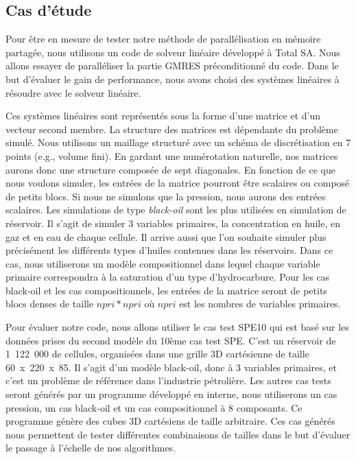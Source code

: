\subsection{Cas d'étude}
Pour être en mesure de tester notre méthode de parallélisation en mémoire partagée, nous utilisons un code de solveur linéaire développé à Total SA.
%
Nous allons essayer de paralléliser la partie GMRES préconditionné du code.
%
Dans le but d'évaluer le gain de performance, nous avons choisi des systèmes linéaires à résoudre avec le solveur linéaire.


Ces systèmes linéaires sont représentés sous la forme d'une matrice et d'un vecteur second membre.
%
La structure des matrices est dépendante du problème simulé.
%
Nous utilisons un maillage structuré avec un schéma de discrétisation en 7 points (e.g., volume fini).
%
En gardant une numérotation naturelle, nos matrices aurons donc une structure composée de sept diagonales.
%
En fonction de ce que nous voulons simuler, les entrées de la matrice pourront être scalaires ou composé de petits blocs.
%
Si nous ne simulons que la pression, nous aurons des entrées scalaires.
%
Les simulations de type {\em black-oil} sont les plus utilisées en simulation de réservoir.
%
Il s'agit de simuler 3 variables primaires, la concentration en huile, en gaz et en eau de chaque cellule.
%
Il arrive aussi que l'on souhaite simuler plus précisément les différents types d'huiles contenues dans les réservoirs.
%
Dans ce cas, nous utiliserons un modèle compositionnel dans lequel chaque variable primaire correspondra à la saturation d'un type d'hydrocarbure.
%
Pour les cas black-oil et les cas compositionnels, les entrées de la matrice seront de petits blocs denses de taille $npri*npri$ où $npri$ est les nombres de variables primaires.

Pour évaluer notre code, nous allons utiliser le cas test SPE10 qui est basé sur les données prises du second modèle du 10ème cas test SPE\cite{SPE10}.
%
C'est un réservoir de 1~122~000 de cellules, organisées dans une grille 3D cartésienne de taille 60~x~220~x~85.
%
Il s'agit d'un modèle black-oil, donc à 3 variables primaires, et c'est un problème de référence dans l'industrie pétrolière.
%
Les autres cas tests seront générés par un programme développé en interne, nous utiliserons un cas pression, un cas black-oil et un cas compositionnel à 8 composants.
%
Ce programme génère des cubes 3D cartésiens de taille arbitraire.
%
Ces cas générés nous permettent de tester différentes combinaisons de tailles dans le but d'évaluer le passage à l'échelle de nos algorithmes.

